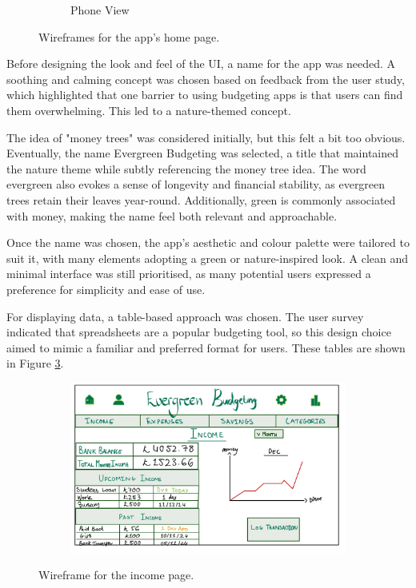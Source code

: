 \documentclass{l4proj}
\begin{document}
\begin{figure}[H]
\begin{subfigure}[b]{0.28\textwidth}
        \caption{Phone View}
        \label{fig:syn2}
    \end{subfigure}
    \caption{Wireframes for the app's home page.}
    \label{fig:wireframes-home}
\end{figure}
\newpage

Before designing the look and feel of the UI, a name for the app was needed. A soothing and calming concept was chosen based on feedback from the user study, which highlighted that one barrier to using budgeting apps is that users can find them overwhelming. This led to a nature-themed concept.

The idea of "money trees" was considered initially, but this felt a bit too obvious. Eventually, the name Evergreen Budgeting was selected, a title that maintained the nature theme while subtly referencing the money tree idea. The word evergreen also evokes a sense of longevity and financial stability, as evergreen trees retain their leaves year-round. Additionally, green is commonly associated with money, making the name feel both relevant and approachable.

Once the name was chosen, the app's aesthetic and colour palette were tailored to suit it, with many elements adopting a green or nature-inspired look. A clean and minimal interface was still prioritised, as many potential users expressed a preference for simplicity and ease of use.

For displaying data, a table-based approach was chosen. The user survey indicated that spreadsheets are a popular budgeting tool, so this design choice aimed to mimic a familiar and preferred format for users. These tables are shown in Figure \ref{fig:wireframe-income}.

\begin{figure}[htb] 
    \centering
    \begin{subfigure}[b]{0.6\textwidth}
        \includegraphics[width=\textwidth]{images/Wireframes/wireframe-income-desktop.png}
    \end{subfigure}   
    \caption{Wireframe for the income page.}
    \label{fig:wireframe-income}
\end{figure}
\end{document}

